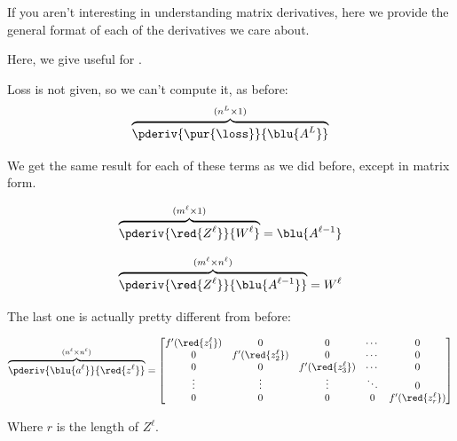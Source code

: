         If you aren't interesting in understanding matrix derivatives, here we provide the general format of each of the derivatives we care about.\\
        
        \begin{notation}
            Here, we give useful  for .
        
            \boxdiv
            
            Loss is not given, so we can't compute it, as before:
            \begin{equation*}
                \overbrace{
                    \pderiv {\pur{\loss}}{\blu{A^L}}
                }^{(n^{L} \times 1)}
            \end{equation*}
            
            \boxdiv
            
            We get the same result for each of these terms as we did before, except in matrix form.
            
            \begin{equation*}
                \overbrace{
                    \pderiv {\red{Z^\ell}}   {W^{\ell}} 
                }^{ (m^{\ell} \times 1) }
                = 
                \blu{A^{\ell-1}}
            \end{equation*}
            
            \begin{equation*}
                \overbrace{
                    \pderiv{\red{Z^\ell}} {\blu{A^{\ell-1}}}
                }^{ (m^{\ell} \times n^{\ell}) }
                =
                W^\ell
            \end{equation*}
            
            \boxdiv
            
            The last one is actually pretty different from before:
            
            \begin{equation*}
                \overbrace{
                    \pderiv {\blu{a^\ell}}   {\red{z^\ell}}
                }^{ (n^{\ell} \times n^{\ell}) }
                =
                \begin{bmatrix}
                    f'({\red{z_1^\ell}})&0                   &0                   &\cdots  & 0 \\
                    0                   &f'({\red{z_2^\ell}})&0                   &\cdots  & 0 \\
                    0                   &0                   &f'({\red{z_3^\ell}})&\cdots  & 0 \\
                    \vdots              &\vdots              &\vdots              &\ddots  & 0 \\
                    0                   &0                   &0                   &0   &f'({\red{z_r^\ell}})
                \end{bmatrix}
            \end{equation*}
            
            Where $r$ is the length of $Z^\ell$.
        \end{notation}
        
